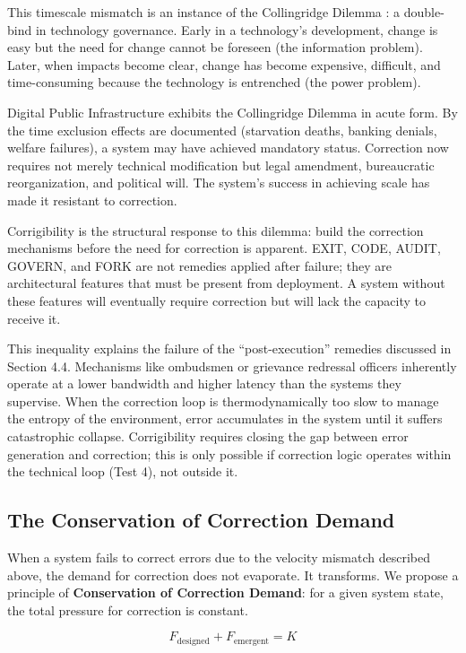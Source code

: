 This timescale mismatch is an instance of the Collingridge Dilemma \citep{collingridge1980}: a double-bind in technology governance. Early in a technology's development, change is easy but the need for change cannot be foreseen (the information problem). Later, when impacts become clear, change has become expensive, difficult, and time-consuming because the technology is entrenched (the power problem).

Digital Public Infrastructure exhibits the Collingridge Dilemma in acute form. By the time exclusion effects are documented (starvation deaths, banking denials, welfare failures), a system may have achieved mandatory status. Correction now requires not merely technical modification but legal amendment, bureaucratic reorganization, and political will. The system's success in achieving scale has made it resistant to correction.

Corrigibility is the structural response to this dilemma: build the correction mechanisms before the need for correction is apparent. EXIT, CODE, AUDIT, GOVERN, and FORK are not remedies applied after failure; they are architectural features that must be present from deployment. A system without these features will eventually require correction but will lack the capacity to receive it.

This inequality explains the failure of the ``post-execution'' remedies discussed in Section 4.4. Mechanisms like ombudsmen or grievance redressal officers inherently operate at a lower bandwidth and higher latency than the systems they supervise. When the correction loop is thermodynamically too slow to manage the entropy of the environment, error accumulates in the system until it suffers catastrophic collapse. Corrigibility requires closing the gap between error generation and correction; this is only possible if correction logic operates within the technical loop (Test 4), not outside it.

\subsection{The Conservation of Correction Demand}

When a system fails to correct errors due to the velocity mismatch described above, the demand for correction does not evaporate. It transforms. We propose a principle of \textbf{Conservation of Correction Demand}: for a given system state, the total pressure for correction is constant.

\begin{equation}
F_{\text{designed}} + F_{\text{emergent}} = K
\label{eq:conservation}
\end{equation}

